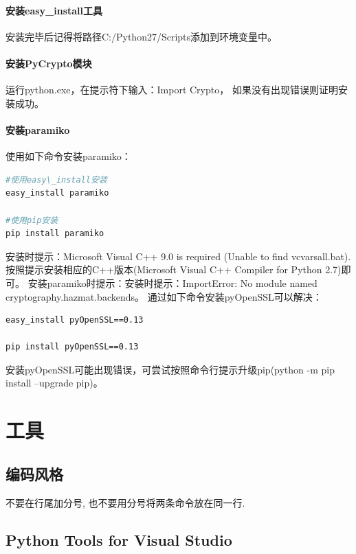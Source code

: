 \documentclass{book}
\begin{document}
\paragraph{安装easy\_install工具}安装完毕后记得将路径C:/Python27/Scripts添加到环境变量中。


\paragraph{安装PyCrypto模块}运行python.exe，在提示符下输入：Import  Crypto，
如果没有出现错误则证明安装成功。

\paragraph{安装paramiko}

使用如下命令安装paramiko：

\begin{lstlisting}[language=Bash]
#使用easy\_install安装
easy_install paramiko

#使用pip安装
pip install paramiko
\end{lstlisting}

安装时提示：Microsoft Visual C++ 9.0 is required (Unable to find vcvarsall.bat).
按照提示安装相应的C++版本(Microsoft Visual C++ Compiler for Python 2.7)即可。
安装paramiko时提示：安装时提示：ImportError: No module named cryptography.hazmat.backends。
通过如下命令安装pyOpenSSL可以解决：

\begin{lstlisting}[language=Bash]
easy_install pyOpenSSL==0.13

pip install pyOpenSSL==0.13
\end{lstlisting}

安装pyOpenSSL可能出现错误，可尝试按照命令行提示升级pip(python -m pip install --upgrade pip)。

\section{工具}

\subsection{编码风格}

不要在行尾加分号, 也不要用分号将两条命令放在同一行.

\subsection{Python Tools for Visual Studio}
\end{document}
